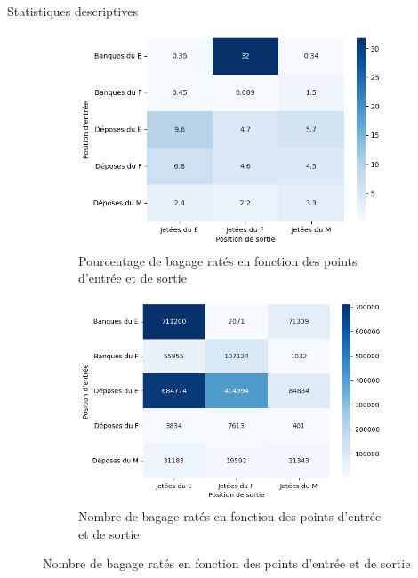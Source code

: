 \documentclass{beamer}
\begin{document}
\begin{frame}{Statistiques descriptives} 
\begin{figure}[ht]
  \centering
  \begin{subfigure}{0.45\textwidth}
    \includegraphics[width=\linewidth]{percentage of failed per positions.png}
    \caption{Pourcentage de bagage ratés en fonction des points d'entrée et de sortie}
    \label{fig:Percentage of mishandled bags according to input and output positions}
  \end{subfigure}
  \hfill
  \begin{subfigure}{0.48\textwidth}
    \includegraphics[width=\linewidth]{number of bags per positions.png}
    \caption{Nombre de bagage ratés en fonction des points d'entrée et de sortie}
    \label{fig:Number of bags according to input and output positions}
  \end{subfigure}
  \label{fig:Mishandled bags according to positions}
\end{figure}
\end{frame}
\end{document}
